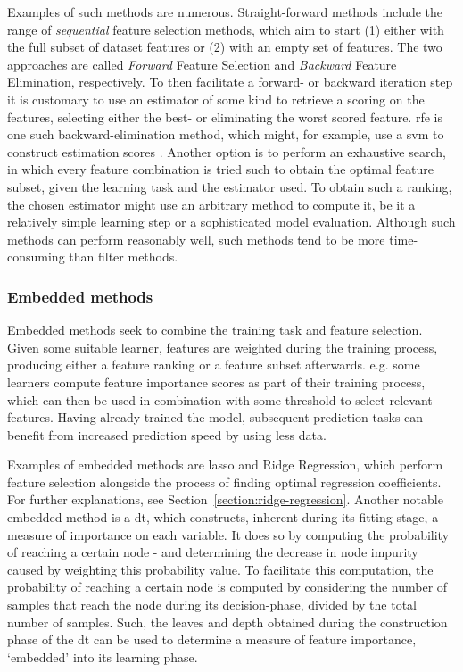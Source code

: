 \documentclass[../main.tex]{subfiles}
\begin{document}
Examples of such methods are numerous. Straight-forward methods include the range of \textit{sequential} feature selection methods, which aim to start (1) either with the full subset of dataset features or (2) with an empty set of features. The two approaches are called \textit{Forward} Feature Selection and \textit{Backward} Feature Elimination, respectively. To then facilitate a forward- or backward iteration step it is customary to use an estimator of some kind to retrieve a scoring on the features, selecting either the best- or eliminating the worst scored feature. \gls{rfe} is one such backward-elimination method, which might, for example, use a \gls{svm} to construct estimation scores \citep{maldonado_weber_2009}. Another option is to perform an exhaustive search, in which every feature combination is tried such to obtain the optimal feature subset, given the learning task and the estimator used. To obtain such a ranking, the chosen estimator might use an arbitrary method to compute it, be it a relatively simple learning step or a sophisticated model evaluation. Although such methods can perform reasonably well, such methods tend to be more time-consuming than filter methods.



\subsubsection{Embedded methods}
Embedded methods seek to combine the training task and feature selection. Given some suitable learner, features are weighted during the training process, producing either a feature ranking or a feature subset afterwards. e.g. some learners compute feature importance scores as part of their training process, which can then be used in combination with some threshold to select relevant features. Having already trained the model, subsequent prediction tasks can benefit from increased prediction speed by using less data.

Examples of embedded methods are \gls{lasso} and Ridge Regression, which perform feature selection alongside the process of finding optimal regression coefficients. For further explanations, see Section~\ref{section:ridge-regression}. Another notable embedded method is a \gls{dt}, which constructs, inherent during its fitting stage, a measure of importance on each variable. It does so by computing the probability of reaching a certain node - and determining the decrease in node impurity caused by weighting this probability value. To facilitate this computation, the probability of reaching a certain node is computed by considering the number of samples that reach the node during its decision-phase, divided by the total number of samples. Such, the leaves and depth obtained during the construction phase of the \gls{dt} can be used to determine a measure of feature importance, `embedded' into its learning phase.
\end{document}

